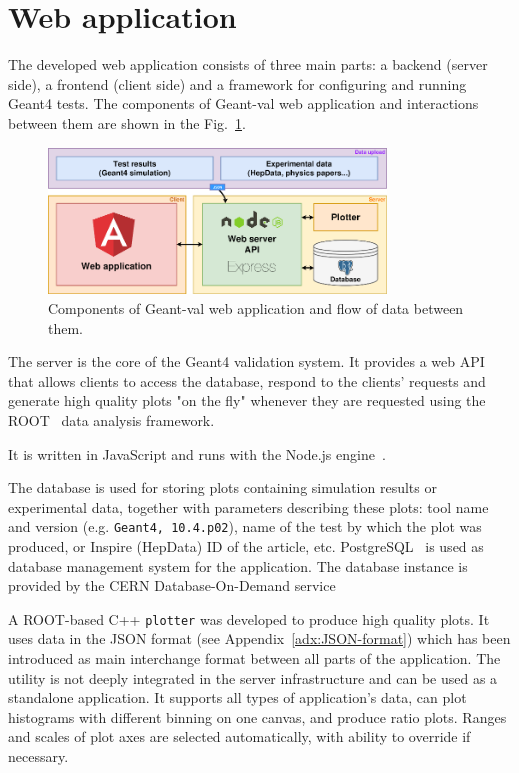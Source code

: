 \section{Web application}
\label{sec-webapplication}

The developed web application consists of three main parts: a backend (server side), a frontend (client side) and a framework for configuring and running Geant4 tests. The components of \textsf{Geant-val} web application and interactions between them are shown in the Fig.~\ref{fig:dataflow}.

\begin{figure}[h]
    \centering
    \includegraphics[width=0.8\textwidth,clip]{schema.png}
    \caption{Components of \textsf{Geant-val} web application and flow of data between them.}
    \label{fig:dataflow}
\end{figure}

The server is the core of the Geant4 validation system. It provides a web API that allows clients to access the database, respond to the clients' requests and generate high quality plots "on the fly" whenever they are requested using the ROOT~\cite{ROOT} data analysis framework.

It is written in JavaScript and runs with the Node.js engine~\cite{NodeJS}.

 The database is used for storing plots containing simulation results or experimental data, together with parameters describing these plots: tool name and version (e.g. \texttt{Geant4, 10.4.p02}), name of the test by which the plot was produced, or Inspire (HepData) ID of the article, etc. PostgreSQL~\cite{Postgre} is used as database management system for the application. The database instance is provided by the CERN Database-On-Demand service  %


 A ROOT-based C++ {\tt plotter} was developed to produce high quality plots. It uses data in the JSON format (see Appendix~\ref{adx:JSON-format}) which has been introduced as main interchange format between all parts of the application. The utility is not deeply integrated in the server infrastructure and can be used as a standalone application. It supports all types of application's data, can plot histograms with different binning on one canvas, and produce ratio plots. Ranges and scales of plot axes are selected automatically, with ability to override if necessary. %

